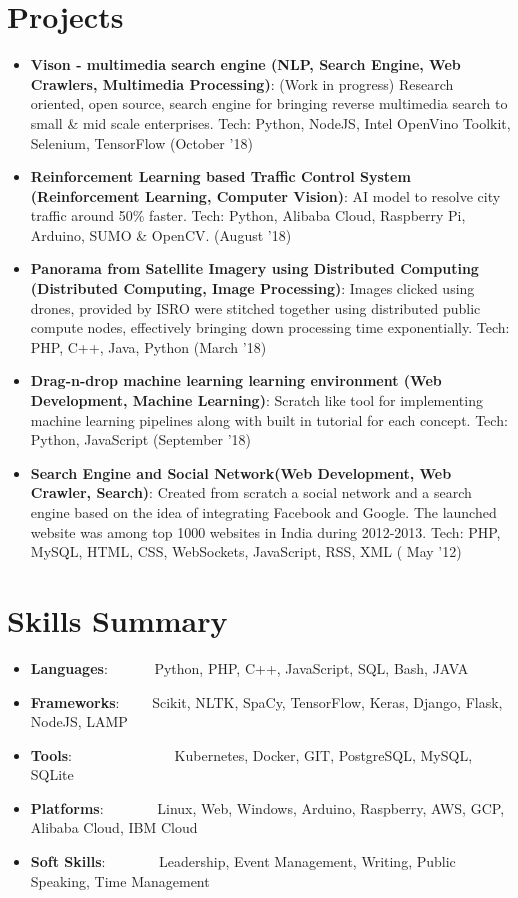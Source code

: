 \documentclass[a4paper,20pt]{article}
\newcommand{\resumeItem}[2]{
  \item\small{
    \textbf{#1}{: #2 \vspace{-2pt}}
  }
}
\newcommand{\resumeSubItem}[2]{\resumeItem{#1}{#2}\vspace{-3pt}}
\newcommand{\resumeSubHeadingListStart}{\begin{itemize}[leftmargin=*]}
\newcommand{\resumeSubHeadingListEnd}{\end{itemize}}
\begin{document}
\section{Projects}
\resumeSubHeadingListStart
\resumeSubItem{Vison - multimedia search engine (NLP, Search Engine, Web Crawlers, Multimedia Processing)}{(Work in progress) Research oriented, open source, search engine for bringing reverse multimedia search to small \& mid scale enterprises. Tech: Python, NodeJS, Intel OpenVino Toolkit, Selenium, TensorFlow (October '18)}
\vspace{2pt}
\resumeSubItem{Reinforcement Learning based Traffic Control System (Reinforcement Learning, Computer Vision)}{AI model to resolve city traffic around 50\%
faster. Tech: Python, Alibaba Cloud, Raspberry Pi, Arduino, SUMO \& OpenCV. (August '18)}
\vspace{2pt}
\resumeSubItem{Panorama from Satellite Imagery using Distributed Computing (Distributed Computing, Image Processing)}{Images clicked using drones, provided by ISRO were stitched together using distributed public compute nodes, effectively bringing down processing time exponentially. Tech: PHP, C++, Java, Python (March '18)}
\vspace{2pt}
\resumeSubItem{Drag-n-drop machine learning learning environment (Web Development, Machine Learning)}{Scratch like tool for implementing machine learning pipelines along with built in tutorial for each concept. Tech: Python, JavaScript (September '18)}
\vspace{2pt}
\resumeSubItem{Search Engine and Social Network(Web Development, Web Crawler, Search)}{Created from scratch a social network and a search engine based on the idea of integrating Facebook and Google. The launched website was among top 1000 websites in India during 2012-2013. Tech: PHP, MySQL, HTML, CSS, WebSockets, JavaScript, RSS, XML ( May '12)}
\resumeSubHeadingListEnd
\vspace{-5pt}

\section{Skills Summary}
	\resumeSubHeadingListStart
	\resumeSubItem{Languages}{~~~~~~Python, PHP, C++, JavaScript, SQL, Bash, JAVA}
	\resumeSubItem{Frameworks}{~~~~Scikit, NLTK, SpaCy, TensorFlow, Keras, Django, Flask, NodeJS, LAMP}
	\resumeSubItem{Tools}{~~~~~~~~~~~~~~Kubernetes, Docker, GIT, PostgreSQL, MySQL, SQLite}
	\resumeSubItem{Platforms}{~~~~~~~Linux, Web, Windows, Arduino, Raspberry, AWS, GCP, Alibaba Cloud, IBM Cloud}
	\resumeSubItem{Soft Skills}{~~~~~~~Leadership, Event Management, Writing, Public Speaking, Time Management}

\resumeSubHeadingListEnd
\end{document}
